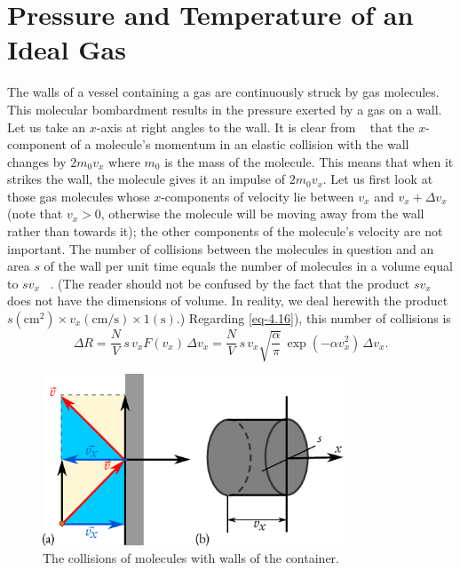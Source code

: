 \section{Pressure and Temperature of an Ideal Gas}

 The walls of a vessel containing a gas are continuously struck by gas molecules. This molecular bombardment results in the pressure exerted by a gas on a wall. Let us take an $x$-axis at right angles to the wall. It is clear from ~ that the $x$-component of a molecule's momentum in an elastic collision with the wall changes by $2m_{0}v_{x}$ where $m_{0}$ is the mass of the molecule. This means that when it strikes the wall, the molecule gives it an impulse of $2m_{0}v_{x}$. Let us first look at those gas molecules whose $x$-components of velocity lie between $v_{x}$ and $v_{x} + \Delta v_{x}$ (note that $v_{x} > 0$, otherwise the molecule will be moving away from the wall rather than towards it); the other components of the molecule's velocity are not important. The number of collisions between the molecules in question and an area $s$ of the wall per unit time equals the number of molecules in a volume equal to $s v_{x}$ ~. (The reader should not be confused by the fact that the product $s v_{x}$ does not have the dimensions of volume. In reality, we deal herewith the product $s(\si{\centi\meter\squared}) \times v_{x} (\si{\centi\meter\per\second}) \times 1 (\si{\second})$.) Regarding \eqref{eq-4.16}), this number of collisions is
\begin{equation*}%
\Delta R = \frac{N}{V} \, s\, v_{x} F(v_{x}) \, \Delta v_{x} =  \frac{N}{V} \, s\, v_{x} \sqrt{\frac{\alpha}{ \pi}} \, \exp (- \alpha v_{x}^{2}) \, \Delta v_{x}.
\end{equation*}

\begin{figure}[!ht]
\centering
\includegraphics[width=0.8\textwidth]{figures/collisions.pdf}
\caption{The collisions of molecules with walls of the container.\label{collisions}}
\end{figure}

